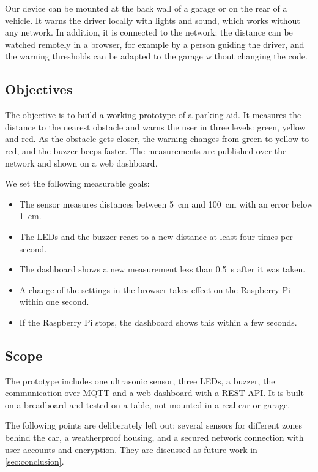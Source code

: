 \documentclass[11pt,a4paper]{article}
\begin{document}
Our device can be mounted at the back wall of a garage or on the rear of a
vehicle. It warns the driver locally with lights and sound, which works without
any network. In addition, it is connected to the network: the distance can be
watched remotely in a browser, for example by a person guiding the driver, and
the warning thresholds can be adapted to the garage without changing the code.

\subsection{Objectives}
The objective is to build a working prototype of a parking aid. It measures the
distance to the nearest obstacle and warns the user in three levels: green,
yellow and red. As the obstacle gets closer, the warning changes from green to
yellow to red, and the buzzer beeps faster. The measurements are published over
the network and shown on a web dashboard.

We set the following measurable goals:
\begin{itemize}
  \item The sensor measures distances between \qty{5}{\centi\metre} and
        \qty{100}{\centi\metre} with an error below \qty{1}{\centi\metre}.
  \item The LEDs and the buzzer react to a new distance at least four times per
        second.
  \item The dashboard shows a new measurement less than \qty{0.5}{\second} after
        it was taken.
  \item A change of the settings in the browser takes effect on the Raspberry Pi
        within one second.
  \item If the Raspberry Pi stops, the dashboard shows this within a few seconds.
\end{itemize}

\subsection{Scope}
The prototype includes one ultrasonic sensor, three LEDs, a buzzer, the
communication over MQTT and a web dashboard with a REST API. It is built on a
breadboard and tested on a table, not mounted in a real car or garage.

The following points are deliberately left out: several sensors for different
zones behind the car, a weatherproof housing, and a secured network connection
with user accounts and encryption. They are discussed as future work in
\cref{sec:conclusion}.
\end{document}

